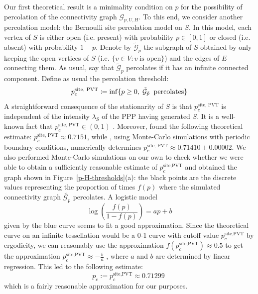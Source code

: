 \documentclass[conference]{IEEEtran}
\begin{document}
\indent Our first theoretical result is a minimality condition on  $p$ for the possibility of percolation of the connectivity graph $\mathcal{G}_{p,U,H}$. %
To this end, we consider another percolation model: the Bernoulli site percolation model \cite{grimmett1999percolation} on $S$. In this model, each vertex of $S$ is either open (i.e. present) with probability $p \in \left[0,1\right]$ or closed (i.e. absent) with probability $1 - p$. 
Denote by $\tilde{\mathcal{G}}_{{p}}$ the subgraph of $S$ obtained by only keeping the open vertices of $S$ (i.e. $\lbrace v \in V: v \; \text{is open} \rbrace$) and the edges of $E$ connecting them. As usual, say that $\tilde{\mathcal{G}}_{{p}}$ percolates \cite{grimmett1999percolation, meester_continuum_1996} if it has an infinite connected component. Define as usual the percolation threshold:
\begin{equation}
\label{critical_site}
p_{c}^{\text{site, PVT}} \coloneqq \inf \lbrace {p} \geq 0, \; \tilde{\mathcal{G}}_{\tilde{p}} \text{\: percolates} \rbrace
\end{equation}
A straightforward consequence of the stationarity of $S$ is that $p_{c}^{\text{site, PVT}}$ is independent of the intensity $\lambda_{S}$ of the PPP having generated $S$. It is a well-known fact that $p_{c}^{\text{site, PVT}}\in (0,1)$ \cite{grimmett1999percolation, ziesche2016bernoulli}. Moreover, \cite{neher2008topological} found the following theoretical estimate: $p_{c}^{\text{site, PVT}} \approx 0.7151 $, while \cite{becker_percolation_2009}, using Monte-Carlo simulations with periodic boundary conditions, numerically determines $p_{c}^{\text{site, PVT}} \approx 0.71410 \pm 0.00002$. We also performed Monte-Carlo simulations on our own to check whether we were able to obtain a sufficiently reasonable estimate of $p_{c}^{\text{site,PVT}}$ and obtained the graph shown in Figure~\ref{p-H-thresholds}(a): the black points are the discrete values representing the proportion of times $f(p)$ where the simulated connectivity graph  $\tilde{\mathcal{G}_{p}}$ percolates. A logistic model \begin{equation*}
\log\left(\frac{f(p)}{1-f(p)}\right)=ap+b
\end{equation*} 
given by the blue curve seems to fit a good approximation. Since the theoretical curve on an infinite tessellation would be a 0-1 curve with cutoff value $p_{c}^{\text{site,PVT}}$ by ergodicity, we can reasonably use the approximation $f\left(p_{c}^{\text{site,PVT}}\right) \approx 0.5$ to get the approximation
$p_{c}^{\text{site,PVT}} \approx -\frac{b}{a}$  ,
where $a$ and $b$ are determined by linear regression. This led to the following estimate:
\begin{equation}
\label{e.pc}
p_c:=p_{c}^{\text{site,PVT}} \approx 0.71299 \;  %
\end{equation}
which is a fairly reasonable approximation for our purposes.
\end{document}
